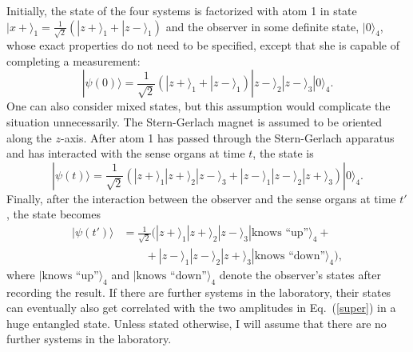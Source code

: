 \documentclass[12pt]{article}
\begin{document}
Initially, the state of the four systems is factorized with atom 1 in state $|x+\rangle_1 = \frac{1}{\sqrt{2}} (|z+\rangle_1 + |z-\rangle_1)$ and the observer in some definite state, $|0\rangle_4$, whose exact properties do not need to be specified, except that she is capable of completing a measurement:
\begin{equation}
|\psi(0)\rangle = \frac{1}{\sqrt{2}} (|z+\rangle_1+|z-\rangle_1)|z-\rangle_2|z-\rangle_3|0\rangle_4.
\end{equation}
One can also consider mixed states, but this assumption would complicate the situation unnecessarily. The Stern-Gerlach magnet is assumed to be oriented along the $z$-axis. After atom 1 has passed through the Stern-Gerlach apparatus and has interacted with the sense organs at time $t$, the state is 
\begin{equation}
|\psi(t)\rangle = \frac{1}{\sqrt{2}} (|z+\rangle_1|z+\rangle_2|z-\rangle_3 +|z-\rangle_1|z-\rangle_2|z+\rangle_3 )|0\rangle_4.
\end{equation}
Finally, after the interaction between the observer and the sense organs at time $t'$, the state becomes
\begin{equation}
\begin{aligned}
|\psi(t')\rangle &= \frac{1}{\sqrt{2}} (|z+\rangle_1|z+ \rangle_2|z-\rangle_3|\mbox{knows ``up''}\rangle_4 + \\ 
& \qquad + |z-\rangle_1|z-\rangle_2|z+\rangle_3 |\mbox{knows ``down''}\rangle_4),\label{super}
\end{aligned}
\end{equation}
where $|\mbox{knows ``up''}\rangle_4$ and $|\mbox{knows ``down''}\rangle_4$ denote the observer's states after recording the result. If there are further systems in the laboratory, their states can eventually also get correlated with the two amplitudes in Eq.~(\ref{super}) in a huge entangled state. Unless stated otherwise, I will assume that there are no further systems in the laboratory. 
\end{document}
